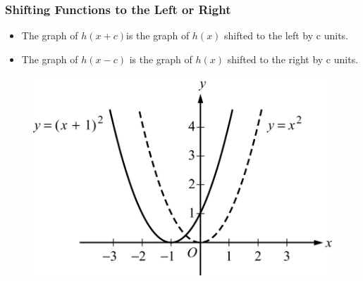 \documentclass[
	11pt, %
	handout,
]{beamer}
\begin{document}

\begin{frame}
	\frametitle{Shifting Functions to the Left or Right}
	\begin{theorem}
		\begin{itemize}
			\item The graph of $h(x+c) $is the graph of $h(x)$ shifted to the \alert{left} by c units. 
			\item The graph of $h(x-c)$ is the graph of $h(x)$ shifted to the \alert{right} by c units.
		\end{itemize}
	\end{theorem}
	

	\begin{figure}
		\includegraphics[width=0.5\linewidth]{Shifting_Function2.jpg} 
	\end{figure}
	
\end{frame}
\end{document}
